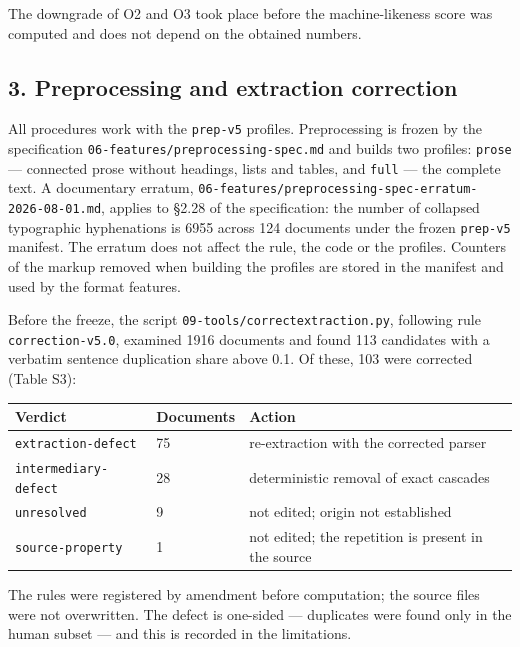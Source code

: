 \documentclass[11pt,a4paper]{article}
\renewcommand{\_}{\textunderscore\allowbreak}
\begin{document}
The downgrade of O2 and O3 took place before the machine-likeness score was
computed and does not depend on the obtained numbers.

\subsection{3. Preprocessing and extraction correction}

All procedures work with the \texttt{prep-\allowbreak{}v5} profiles. Preprocessing is frozen by the
specification \texttt{06-\allowbreak{}features/preprocessing-\allowbreak{}spec.md} and builds two profiles: \texttt{prose} —
connected prose without headings, lists and tables, and \texttt{full} — the complete text.
A documentary erratum,
\texttt{06-\allowbreak{}features/preprocessing-\allowbreak{}spec-\allowbreak{}erratum-\allowbreak{}2026-\allowbreak{}08-\allowbreak{}01.md}, applies to §2.28 of the
specification: the number of collapsed typographic hyphenations is 6955 across 124
documents under the frozen \texttt{prep-\allowbreak{}v5} manifest. The erratum does not affect the
rule, the code or the profiles. Counters of the markup removed when building the
profiles are stored in the manifest and used by the format features.

Before the freeze, the script \texttt{09-\allowbreak{}tools/correct\_extraction.py}, following rule
\texttt{correction-\allowbreak{}v5.0}, examined 1916 documents and found 113 candidates with a
verbatim sentence duplication share above 0.1. Of these, 103 were corrected
(Table S3):

\begin{center}
\small
\begin{tabularx}{\textwidth}{llX}
\toprule
Verdict & Documents & Action \\
\midrule
\texttt{extraction-\allowbreak{}defect} & 75 & re-extraction with the corrected parser \\
\texttt{intermediary-\allowbreak{}defect} & 28 & deterministic removal of exact cascades \\
\texttt{unresolved} & 9 & not edited; origin not established \\
\texttt{source-\allowbreak{}property} & 1 & not edited; the repetition is present in the source \\
\bottomrule
\end{tabularx}
\end{center}

The rules were registered by amendment before computation; the source files were
not overwritten. The defect is one-sided — duplicates were found only in the human
subset — and this is recorded in the limitations.
\end{document}
